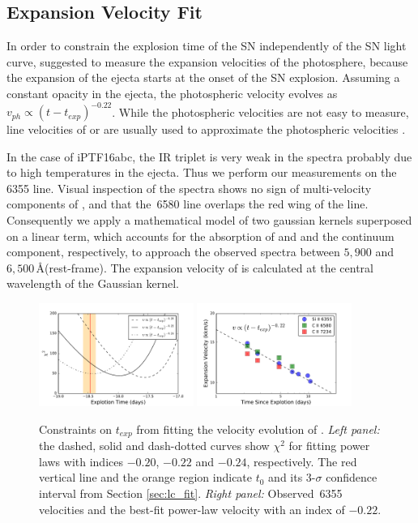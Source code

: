 \documentclass[twocolumn]{aastex61}
\begin{document}
\subsection{Expansion Velocity Fit}
\label{sec:early_vel}

In order to constrain the explosion time of the SN independently of
the SN light curve, \citet{2014ApJ...784...85P} suggested to measure
the expansion velocities of the photosphere, because the expansion of
the ejecta starts at the onset of the SN explosion. Assuming a
constant opacity in the ejecta, the photospheric velocity evolves as
$v_{ph}\propto(t-t_{exp})^{-0.22}$. While the photospheric velocities
are not easy to measure, line velocities of  or 
are usually used to approximate the photospheric velocities
\citep{2014ApJ...784...85P,2016ApJ...826..144S}.

In the case of iPTF16abc, the  IR triplet is very weak in
the spectra probably due to high temperatures in the ejecta. Thus we
perform our measurements on the \,6355 line. Visual
inspection of the spectra shows no sign of multi-velocity components
of , and that the \,6580 line overlaps the red
wing of the  line. Consequently we apply a mathematical
model of two gaussian kernels superposed on a linear term, which
accounts for the absorption of  and  and the
continuum component, respectively, to approach the observed spectra
between $5,900$ and $6,500$\,\AA (rest-frame). The expansion
velocity of  is calculated at the central wavelength
of the  Gaussian kernel.

\begin{figure}[!thb]
  \centering
  \includegraphics[width=0.45\textwidth]{Chi2.pdf}
  \includegraphics[width=0.45\textwidth]{VelocityPlot.pdf}
  \caption{Constraints on $t_{exp}$ from fitting the velocity
    evolution of .
    \textit{Left panel:} the dashed, solid
    and dash-dotted curves show $\chi^2$ for fitting power laws with
    indices $-0.20$, $-0.22$ and $-0.24$, respectively. The red
    vertical line and the orange region indicate $t_0$ and its
    3-$\sigma$ confidence interval from Section
    \ref{sec:lc_fit}.
    \textit{Right panel:} Observed \,6355
    velocities and the best-fit power-law velocity with an index of
    $-0.22$.}
  \label{fig:velocity_t_exp}
\end{figure}
\end{document}
